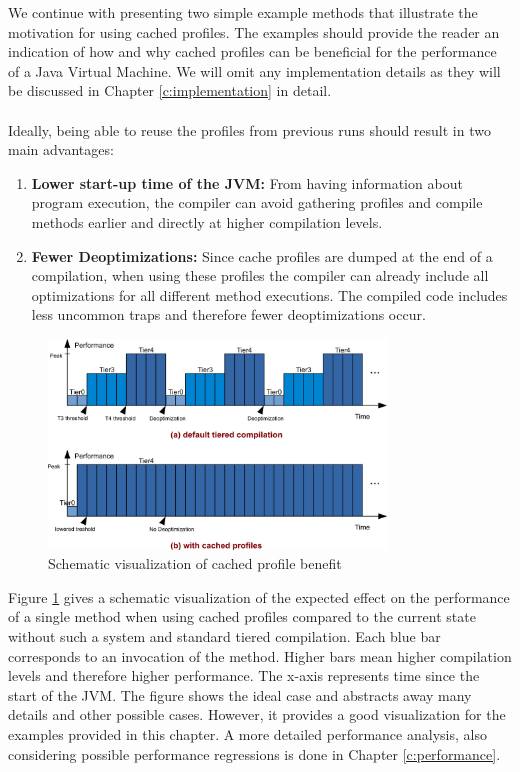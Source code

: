 We continue with presenting two simple example methods that illustrate the motivation for using cached profiles.
The examples should provide the reader an indication of how and why cached profiles can be beneficial for the performance of a Java Virtual Machine.
We will omit any implementation details as they will be discussed in Chapter \ref{c:implementation} in detail.
\\\\
Ideally, being able to reuse the profiles from previous runs should result in two main advantages:
\begin{enumerate}
  \item \textbf{Lower start-up time of the JVM:} From having information about program execution, the compiler can avoid gathering profiles and compile methods earlier and directly at higher compilation levels.
  \item \textbf{Fewer Deoptimizations:} Since cache profiles are dumped at the end of a compilation, when using these profiles the compiler can already include all optimizations for all different method executions. The compiled code includes less uncommon traps and therefore fewer deoptimizations occur.
\end{enumerate}
\begin{figure}[ht!]
  \begin{center}
    \centering
    \includegraphics[width=0.8\textwidth]{figures/baseline_vs_usage_large.png}
    \caption{Schematic visualization of cached profile benefit}
    \label{f:baseline_vs_usage}
  \end{center}
\end{figure}
Figure \ref{f:baseline_vs_usage} gives a schematic visualization of the expected effect on the performance of a single method when using cached profiles compared to the current state without such a system and standard tiered compilation.
Each blue bar corresponds to an invocation of the method. Higher bars mean higher compilation levels and therefore higher performance. The x-axis represents time since the start of the JVM. The figure shows the ideal case and abstracts away many details and other possible cases. However, it provides a good visualization for the examples provided in this chapter. A more detailed performance analysis, also considering possible performance regressions is done in Chapter \ref{c:performance}.
